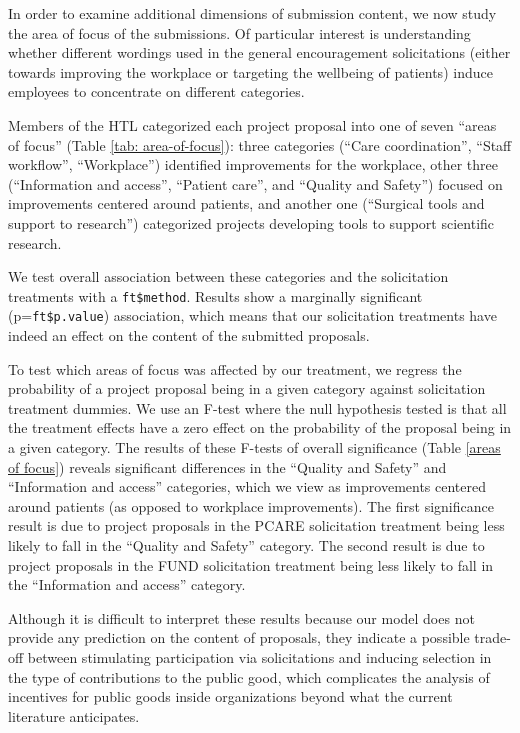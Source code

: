 \documentclass[12pt, titlepage]{article}
\begin{document}
In order to examine additional dimensions of submission content, we now
study the area of focus of the submissions. Of particular interest is
understanding whether different wordings used in the general
encouragement solicitations (either towards improving the workplace or
targeting the wellbeing of patients) induce employees to concentrate on
different categories.

Members of the HTL categorized each project proposal into one of seven
``areas of focus'' (Table \ref{tab: area-of-focus}): three categories
(``Care coordination'', ``Staff workflow'', ``Workplace'') identified
improvements for the workplace, other three (``Information and access'',
``Patient care'', and ``Quality and Safety'') focused on improvements
centered around patients, and another one (``Surgical tools and support
to research'') categorized projects developing tools to support
scientific research.

We test overall association between these categories and the
solicitation treatments with a \texttt{ft\$method}. Results show a
marginally significant (p=\texttt{ft\$p.value}) association, which means
that our solicitation treatments have indeed an effect on the content of
the submitted proposals.

To test which areas of focus was affected by our treatment, we regress
the probability of a project proposal being in a given category against
solicitation treatment dummies. We use an F-test where the null
hypothesis tested is that all the treatment effects have a zero effect
on the probability of the proposal being in a given category. The
results of these F-tests of overall significance (Table
\ref{areas of focus}) reveals significant differences in the ``Quality
and Safety'' and ``Information and access'' categories, which we view as
improvements centered around patients (as opposed to workplace
improvements). The first significance result is due to project proposals
in the PCARE solicitation treatment being less likely to fall in the
``Quality and Safety'' category. The second result is due to project
proposals in the FUND solicitation treatment being less likely to fall
in the ``Information and access'' category.

Although it is difficult to interpret these results because our model
does not provide any prediction on the content of proposals, they
indicate a possible trade-off between stimulating participation via
solicitations and inducing selection in the type of contributions to the
public good, which complicates the analysis of incentives for public
goods inside organizations beyond what the current literature
anticipates.
\end{document}

